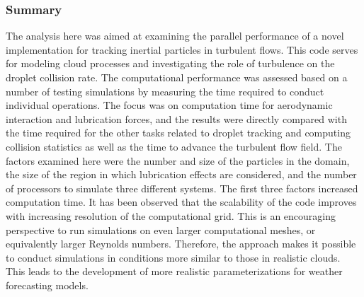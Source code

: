 \documentclass[../thesis.tex]{subfiles}
\begin{document}
\subsubsection{Summary}
The analysis here was aimed at examining the parallel performance of a novel implementation for tracking inertial particles in turbulent flows. This code serves for modeling cloud processes and investigating the role of turbulence on the droplet collision rate. The computational performance was assessed based on a number of testing simulations by measuring the time required to conduct individual operations. The focus was on computation time for aerodynamic interaction and lubrication forces, and the results were directly compared with the time required for the other tasks related to droplet tracking and computing collision statistics as well as the time to advance the turbulent flow field. The factors examined here were the number and size of the particles in the domain, the size of the region in which lubrication effects are considered, and the number of processors to simulate three different systems. The first three factors increased computation time. It has been observed that the scalability of the code improves with increasing resolution of the computational grid. This is an encouraging perspective to run simulations on even larger computational meshes, or equivalently larger Reynolds numbers. Therefore, the approach makes it possible to conduct simulations in conditions more similar to those in realistic clouds. This leads to the development of more realistic parameterizations for weather forecasting models.

%
%
\newpage
\end{document}
